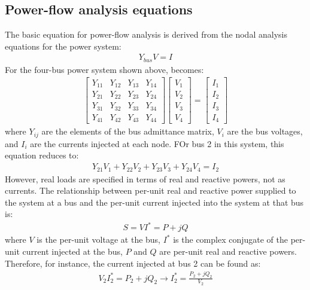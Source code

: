\subsection{Power-flow analysis equations}
The basic equation for power-flow analysis is derived from the nodal analysis equations for the power system:
\begin{gather}
	Y_{bus}V = I
\end{gather}
For the four-bus power system shown above, becomes:
\begin{gather}
	\begin{bmatrix}
		Y_{11} & Y_{12} & Y_{13} & Y_{14} \\
		Y_{21} & Y_{22} & Y_{23} & Y_{24} \\
		Y_{31} & Y_{32} & Y_{33} & Y_{34} \\
		Y_{41} & Y_{42} & Y_{43} & Y_{44}
	\end{bmatrix} \begin{bmatrix}
		V_1 \\
		V_2 \\
		V_3 \\
		V_4
	\end{bmatrix}=\begin{bmatrix}
		I_1 \\
		I_2 \\
		I_3 \\
		I_4
	\end{bmatrix}
\end{gather}
where $Y_{ij}$ are the elements of the bus admittance matrix, $V_i$ are the bus voltages, and $I_i$ are the currents injected at each node. FOr bus 2 in this system, this equation reduces to:
\begin{gather}
	Y_{21}V_1 + Y_{22}V_2 + Y_{23}V_3 + Y_{24}V_4 = I_2
\end{gather}
However, real loads are specified in terms of real and reactive powers, not as currents. The relationship between per-unit real and reactive power supplied to the system at a bus and the per-unit current injected into the system at that bus is:
\begin{gather}
	S = VI^* = P+jQ
\end{gather}
where $V$ is the per-unit voltage at the bus, $I^*$ is the complex conjugate of the per-unit current injected at the bus, $P$ and $Q$ are per-unit real and reactive powers. Therefore, for instance, the current injected at bus 2 can be found as:
\begin{gather}
	V_2 I^*_2 = P_2 + jQ_2 \rightarrow I^*_2 = \frac{P_2 + jQ_2}{V_2}
\end{gather}
